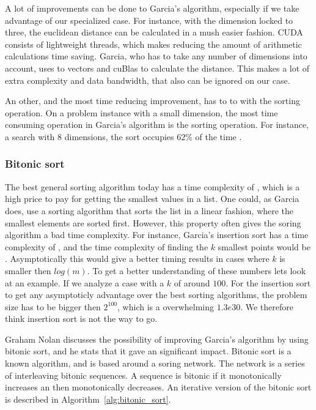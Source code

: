 A lot of improvements can be done to Garcia's algorithm, especially if we take advantage of our specialized case. For instance, with the dimension locked to three, the euclidean distance can be calculated in a mush easier fashion.  CUDA consists of lightweight threads, which makes reducing the amount of arithmetic calculations time saving. Garcia, who has to take any number of dimensions into account, uses to vectors and cuBlas to calculate the distance. This makes a lot of extra complexity and data bandwidth, that also can be ignored on our case.

An other, and the most time reducing improvement, has to to with the sorting operation. On a problem instance with a small dimension, the most time consuming operation in Garcia's algorithm is the sorting operation. For instance, a search with $8$ dimensions, the sort occupies $62\%$ of the time \citep[Correct table]{Garcia2008}.

\subsubsection{Bitonic sort} %
\label{ssub:bitonic_sort}

The best general sorting algorithm today has a time complexity of  \cite{Cormen:2001}, which is a high price to pay for getting the smallest values in a list. One could, as Garcia does, use a sorting algorithm that sorts the list in a linear fashion, where the smallest elements are sorted first. However, this property often gives the soring algorithm a bad time complexity. For instance, Garcia's insertion sort\cite{Cormen:2001} has a time complexity of , and the time complexity of finding the $k$ smallest points would be . Asymptotically this would give a better timing results in cases where $k$ is smaller then $log(m)$. To get a better understanding of these numbers lets look at an example. If we analyze a case with a $k$ of around $100$. For the insertion sort to get any asymptoticly advantage over the best sorting algorithms, the problem size has to be bigger then $2^{100}$, which is a overwhelming $1.3e30$. We therefore think insertion sort is not the way to go.

Graham Nolan discusses the possibility of improving Garcia's algorithm by using bitonic sort, and he stats that it gave an significant impact\citep{Nolan}. Bitonic sort is a known  algorithm, and is based around a soring network. The network is a series of interleaving bitonic sequences. A sequence is bitonic if it monotonically increases an then monotonically decreases\cite{Cormen:2001}. An iterative version of the bitonic sort is described in Algorithm~\ref{alg:bitonic_sort}.

